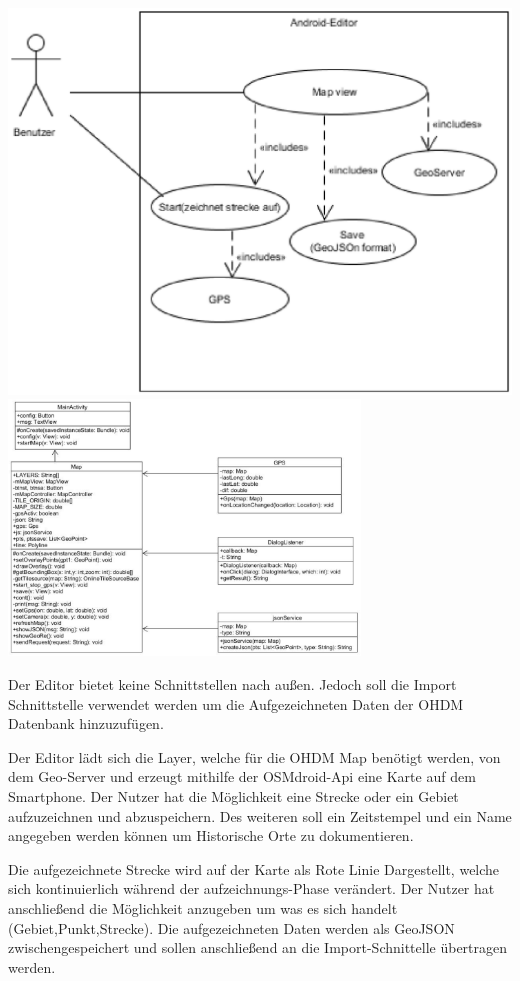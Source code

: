 \includegraphics[width=1.0\textwidth]{UseCase}
\includegraphics[width=0.7\textwidth]{OOA}

Der Editor bietet keine Schnittstellen nach außen. Jedoch soll die Import Schnittstelle verwendet werden um die Aufgezeichneten Daten der OHDM Datenbank hinzuzufügen.

Der Editor lädt sich die Layer, welche für die OHDM Map benötigt werden, von dem Geo-Server und erzeugt mithilfe der OSMdroid-Api eine Karte auf dem Smartphone. Der Nutzer hat die Möglichkeit eine Strecke oder ein Gebiet aufzuzeichnen und abzuspeichern. Des weiteren soll ein Zeitstempel und ein Name angegeben werden können um Historische Orte zu dokumentieren.

Die aufgezeichnete Strecke wird auf der Karte als Rote Linie Dargestellt, welche sich kontinuierlich während der aufzeichnungs-Phase verändert. Der Nutzer hat anschließend die Möglichkeit anzugeben um was es sich handelt (Gebiet,Punkt,Strecke). Die aufgezeichneten Daten werden als GeoJSON zwischengespeichert und sollen anschließend an die Import-Schnittelle übertragen werden.

